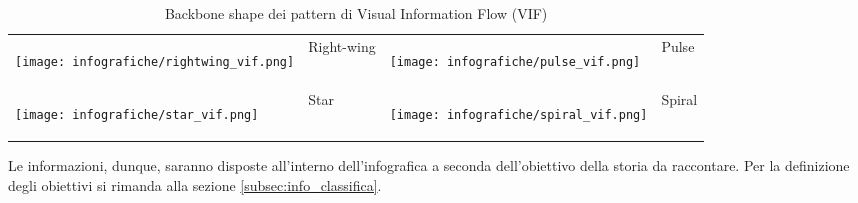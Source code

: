 \begin{table}[H]
\begin{tabular}{|>{\centering\arraybackslash} m{}| >{\centering\arraybackslash} m{}| >{\centering\arraybackslash} m{}| >{\centering\arraybackslash} m{}|}
        \begin{center}\texttt{[image: infografiche/rightwing\_vif.png]}\end{center} & Right-wing
        & \begin{center}\texttt{[image: infografiche/pulse\_vif.png]}\end{center} & Pulse \\
        \begin{center}\texttt{[image: infografiche/star\_vif.png]}\end{center} & Star 
        & \begin{center}\texttt{[image: infografiche/spiral\_vif.png]}\end{center} & Spiral \\
        \hline
    \end{tabular}
    \vspace{0.2cm}
    \caption{Backbone shape dei pattern di Visual Information Flow (VIF)}
    \label{tab:pattern_vif}
\end{table}

\noindent Le informazioni, dunque, saranno disposte all'interno dell'infografica a seconda dell'obiettivo della storia da raccontare.
Per la definizione degli obiettivi si rimanda alla sezione \ref{subsec:info_classifica}.

